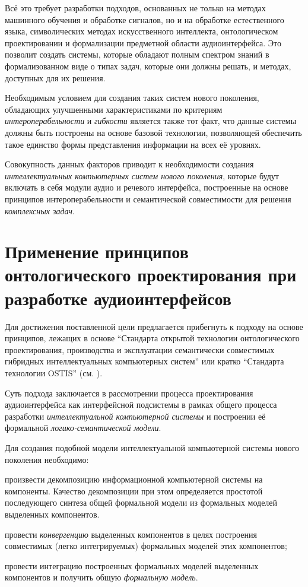 Всё это требует разработки подходов, основанных не только на методах машинного обучения и обработке сигналов, но и на обработке естественного языка, символических методах искусственного интеллекта, онтологическом проектировании и формализации предметной области аудиоинтерфейса. Это позволит создать системы, которые обладают полным спектром знаний в формализованном виде о типах задач, которые они должны решать, и методах, доступных для их решения.

Необходимым условием для создания таких систем нового поколения, обладающих улучшенными характеристиками по критериям \textit{интероперабельности} и \textit{гибкости} является также тот факт, что данные системы должны быть построены на основе базовой технологии, позволяющей обеспечить такое единство формы представления информации на всех её уровнях.
 
Совокупность данных факторов приводит к необходимости создания \textit{интеллектуальных компьютерных систем нового поколения}, которые будут включать в себя модули аудио и речевого интерфейса, построенные на основе принципов интероперабельности и семантической совместимости для решения \textit{комплексных задач}.


\section{Применение принципов онтологического проектирования при разработке аудиоинтерфейсов}
\label{sec_audio_interfaces_ostis_approach}

Для достижения поставленной цели предлагается прибегнуть к подходу на основе принципов, лежащих в основе ``Стандарта открытой технологии онтологического проектирования, производства и эксплуатации семантически совместимых гибридных интеллектуальных компьютерных систем'' или кратко ``Стандарта технологии OSTIS'' (см. ).

Суть подхода заключается в рассмотрении процесса проектирования аудиоинтерфейса как интерфейсной подсистемы в рамках общего процесса разработки \textit{интеллектуальной компьютерной системы} и построении её формальной \textit{логико-семантической модели}.

Для создания подобной модели интеллектуальной компьютерной системы нового поколения необходимо:
\begin{textitemize}    
    \item произвести декомпозицию информационной компьютерной системы на компоненты. Качество декомпозиции при этом определяется простотой последующего синтеза общей формальной модели из формальных моделей выделенных компонентов.
    \item провести \textit{конвергенцию} выделенных компонентов в целях построения совместимых (легко интегрируемых) формальных моделей этих компонентов;
    \item провести интеграцию построенных формальных моделей выделенных компонентов и получить общую \textit{формальную модель}.
\end{textitemize}

